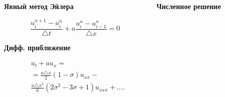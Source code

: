 \documentclass[10pt,xcolor=pst,aspectratio=169]{beamer}
\begin{document}
\begin{frame}{}

    \transdissolve[duration=0.1]
    \justifying
    \large



    \begin{columns}
        \begin{column}[T]{0.5\textwidth}
            \begin{center}
                \textbf{Явный метод Эйлера}
            \end{center}
            \[
                \frac{u^{n + 1}_{i} - u^{n}_{i}}{\triangle t} + a \frac{u^{n}_{i} - u^{n}_{i - 1}}{\triangle x} = 0
            \]
            \begin{center}
                \textbf{Дифф. приближение}
            \end{center}
            \[
                \begin{split}
                    &u_{t} + a u_{x} =\\
                    &= \frac{a \triangle x}{2} (1 - \sigma) \boxed{u_{xx}} -\\
                    &\frac{a \triangle x^{2}}{6} (2 \sigma^{2} - 3 \sigma + 1) \boxed{u_{xxx}} + \ldots.
                \end{split}
            \]
        \end{column}
        \begin{column}[T]{0.5\textwidth}
            \begin{center}
                \textbf{Численное решение}
            \end{center}
            \begin{center}
                 \begin{center}
                \end{center}
            \end{center}
        \end{column}
    \end{columns}

\end{frame}
\end{document}
